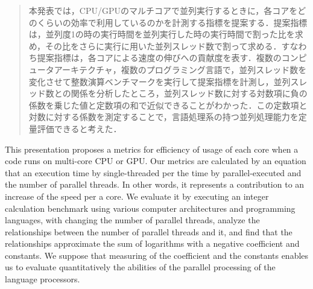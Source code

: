 \begin{abstract}
本発表では，CPU/GPUのマルチコアで並列実行するときに，各コアをどのくらいの効率で利用しているのかを計測する指標を提案する．提案指標は，並列度1の時の実行時間を並列実行した時の実行時間で割った比を求め，その比をさらに実行に用いた並列スレッド数で割って求める．すなわち提案指標は，各コアによる速度の伸びへの貢献度を表す．複数のコンピュータアーキテクチャ，複数のプログラミング言語で，並列スレッド数を変化させて整数演算ベンチマークを実行して提案指標を計測し，並列スレッド数との関係を分析したところ，並列スレッド数に対する対数項に負の係数を乗じた値と定数項の和で近似できることがわかった．この定数項と対数に対する係数を測定することで，言語処理系の持つ並列処理能力を定量評価できると考えた．
\end{abstract}
\begin{eabstract}
This presentation proposes a metrics for efficiency of usage of each core when a code runs on multi-core CPU or GPU. Our metrics are calculated by an equation that an execution time by single-threaded per the time by parallel-executed and the number of parallel threads. In other words, it represents a contribution to an increase of the speed per a core. We evaluate it by executing an integer calculation benchmark using various computer architectures and programming languages, with changing the number of parallel threads, analyze the relationships between the number of parallel threads and it, and find that the relationships approximate the sum of logarithms with a negative coefficient and constants. We suppose that measuring of the coefficient and the constants enables us to evaluate quantitatively the abilities of the parallel processing of the language processors.
\end{eabstract}





